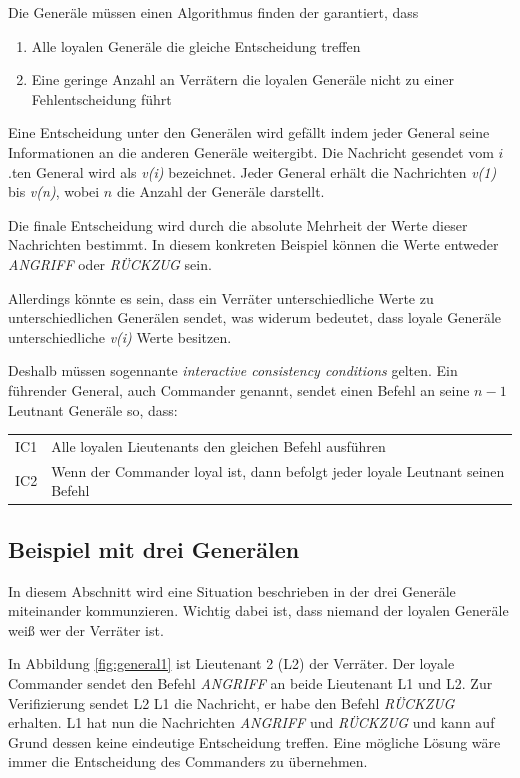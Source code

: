 \documentclass{article}
\begin{document}
\medskip 

Die Generäle müssen einen Algorithmus finden der garantiert, dass

\begin{enumerate}[label=(\alph*)]
\item Alle loyalen Generäle die gleiche Entscheidung treffen 
\item Eine geringe Anzahl an Verrätern die loyalen Generäle nicht zu einer Fehlentscheidung führt
\end{enumerate}

Eine Entscheidung unter den Generälen wird gefällt indem jeder General seine Informationen an die anderen Generäle weitergibt. 
Die Nachricht gesendet vom $i$.ten General wird als \textit{v(i)} bezeichnet.
Jeder General erhält die Nachrichten \textit{v(1)} bis \textit{v(n)}, wobei $n$ die Anzahl der Generäle darstellt. 

Die finale Entscheidung wird durch die absolute Mehrheit der Werte dieser Nachrichten
bestimmt. In diesem konkreten Beispiel können die Werte entweder \textit{ANGRIFF} oder \textit{RÜCKZUG} sein.

Allerdings könnte es sein, dass ein Verräter unterschiedliche Werte zu unterschiedlichen Generälen sendet, 
was widerum bedeutet, dass loyale Generäle unterschiedliche \textit{v(i)} Werte besitzen. 

\medskip 

Deshalb müssen sogennante \textit{interactive consistency conditions} gelten.
Ein führender General, auch Commander genannt, sendet einen Befehl an seine $n - 1$ Leutnant 
Generäle so, dass:

\smallskip 

\begin{tabular}{l l}
IC1 & Alle loyalen Lieutenants den gleichen Befehl ausführen \\
IC2 & Wenn der Commander loyal ist, dann befolgt jeder loyale Leutnant seinen Befehl
\end{tabular}

\subsection{Beispiel mit drei Generälen}
In diesem Abschnitt wird eine Situation beschrieben in der drei Generäle miteinander kommunzieren. 
Wichtig dabei ist, dass niemand der loyalen Generäle weiß wer der Verräter ist. 

\medskip

In Abbildung \ref{fig:general1} ist Lieutenant 2 (L2) der Verräter. Der loyale Commander
sendet den Befehl \textit{ANGRIFF} an beide Lieutenant L1 und L2. Zur Verifizierung sendet L2 L1 die Nachricht,
er habe den Befehl \textit{RÜCKZUG} erhalten. 
L1 hat nun die Nachrichten \textit{ANGRIFF} und \textit{RÜCKZUG} und 
kann auf Grund dessen keine eindeutige Entscheidung treffen. Eine mögliche Lösung wäre
immer die Entscheidung des Commanders zu übernehmen. 
\end{document}
